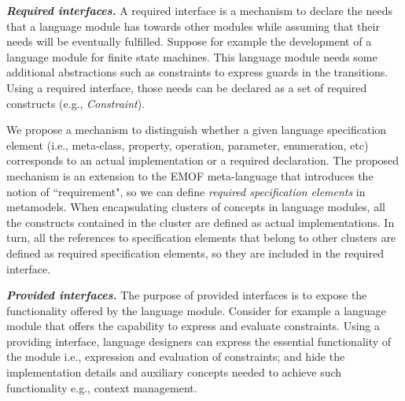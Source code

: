 \vspace{2mm}
\textit{\textbf{Required interfaces.}} A required interface is a mechanism to declare the needs that a language module has towards other modules while assuming that their needs will be eventually fulfilled. Suppose for example the development of a language module for finite state machines. This language module needs some additional abstractions such as constraints to express guards in the transitions. Using a required interface, those needs can be declared as a set of required constructs (e.g., \textsl{Constraint}). 

We propose a mechanism to distinguish whether a given language specification element (i.e., meta-class, property, operation, parameter, enumeration, etc) corresponds to an actual implementation or a required declaration. The proposed mechanism is an extension to the EMOF meta-language that introduces the notion of ``requirement", so we can define \textit{required specification elements} in metamodels. When encapsulating clusters of concepts in language modules, all the constructs contained in the cluster are defined as actual implementations. In turn, all the references to specification elements that belong to other clusters are defined as required specification elements, so they are included in the required interface. 

%



\vspace{2mm}
\textit{\textbf{Provided interfaces.}} The purpose of provided interfaces is to expose the functionality offered by the language module. Consider for example a language module that offers the capability to express and evaluate constraints. Using a providing interface, language designers can express the essential functionality of the module i.e., expression and evaluation of constraints; and hide the implementation details and auxiliary concepts needed to achieve such functionality e.g., context management.

